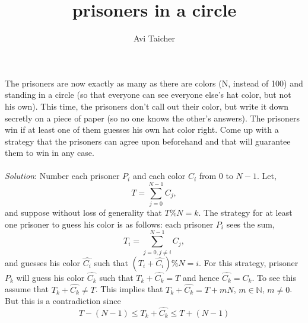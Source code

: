 \message{ !name(prisoners.tex)}\documentclass{article} \usepackage{amsmath} \usepackage{amssymb}
\begin{document}

%
\title{prisoners in a circle}
%
\author{Avi Taicher}
%
\maketitle
%
The prisoners are now exactly as many as there are colors (N, instead of 100) and standing in a circle (so that everyone can see everyone else's hat color, but not his own). This time, the prisoners don't call out their color, but write it down secretly on a piece of paper (so no one knows the other's answers). The prisoners win if at least one of them guesses his own hat color right. Come up with a strategy that the prisoners can agree upon beforehand and that will guarantee them to win in any case.\\\\
%
\textit{Solution}: Number each prisoner $P_i$ and each color $C_i$
from $0$ to $N-1$. Let,
%
\begin{equation*}
  T = \sum_{j=0}^{N-1}C_j,
\end{equation*}
%
and suppose without loss of generality that $T\%N = k$.  The strategy
for at least one prisoner to guess his color is as follows: each
prisoner $P_i$ sees the sum,
%
\begin{equation*}
  T_i = \sum_{j=0,j \neq i}^{N-1}C_j,
\end{equation*}
%
and guesses his color $\hat{C_i}$ such that $(T_i+\hat{C_i})\%N = i$.
For this strategy, prisoner $P_k$ will guess his color $\hat{C_k}$
such that $T_k + \hat{C_k} = T$ and hence $\hat{C_k} = C_k$.  To see
this assume that $T_k + \hat{C_k} \neq T$.  This implies that $T_k +
\hat{C_k} = T + mN$, $m\in \mathbb{N}$, $m \neq 0$.  But this is a
contradiction since
%
\begin{equation*}
  T-(N-1) \leq T_k + \hat{C_k} \leq T+(N-1)
\end{equation*}
%
\end{document}
